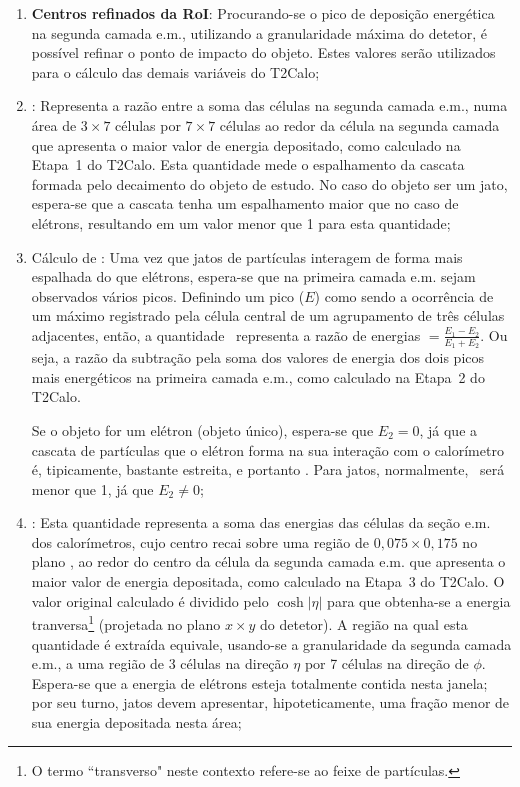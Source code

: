 \begin{enumerate}
\item \textbf{Centros refinados da RoI}: Procurando-se o pico de deposição
energética na segunda camada e.m., utilizando a granularidade máxima do
detetor, é possível refinar o ponto de impacto do objeto. Estes valores serão
utilizados para o cálculo das demais variáveis do T2Calo;

\item \textbf{\rcore}: Representa a razão entre a soma das células na segunda
camada e.m., numa área de $3 \times 7$ células por $7 \times 7$ células ao
redor da célula na segunda camada que apresenta o maior valor de energia
depositado, como calculado na Etapa~1 do T2Calo. Esta quantidade mede o
espalhamento da cascata formada pelo decaimento do objeto de estudo. No caso
do objeto ser um jato, espera-se que a cascata tenha um espalhamento maior que
no caso de elétrons, resultando em um valor menor que 1 para esta quantidade;

\item Cálculo de \textbf{\eratio}: Uma vez que jatos de par\-tí\-culas
interagem de forma mais espalhada do que e\-lé\-trons, espera-se que na
primeira camada e.m. sejam observados vários picos. Definindo um pico ($E$)
como sendo a ocorrência de um máximo registrado pela célula central de um
agrupamento de três células adjacentes, então, a quantidade \eratio\
representa a razão de energias \eratio$=\frac{E_1-E_2}{E_1+E_2}$. Ou seja, a
razão da subtração pela soma dos valores de energia dos dois picos mais
energéticos na primeira camada e.m., como calculado na Etapa~2 do T2Calo.

Se o objeto for um elétron (objeto único), espera-se que $E_2=0$, já que a
cascata de partículas que o elétron forma na sua interação com o calorímetro
é, tipicamente, bastante estreita, e portanto \eratio=1. Para jatos,
normalmente, \eratio\ será menor que 1, já que $E_2 \neq 0$;

\item \textbf{\etem}: Esta quantidade representa a soma das energias das
células da seção e.m. dos calorímetros, cujo centro recai sobre uma região de
$0,075 \times 0,175$ no plano \ep, ao redor do centro da célula da segunda
camada e.m. que apresenta o maior valor de energia depositada, como calculado
na Etapa~3 do T2Calo. O valor original calculado é dividido pelo
$\cosh{|\eta|}$ para que obtenha-se a energia tranversa\footnote{O termo
``transverso" neste contexto refere-se ao feixe de partículas.} (projetada no
plano $x \times y$ do detetor). A região na qual esta quantidade é extraída
equivale, usando-se a granularidade da segunda camada e.m., a uma região de 3
células na direção $\eta$ por 7 células na direção de $\phi$. Espera-se que a
energia de elétrons esteja totalmente contida nesta janela; por seu turno,
jatos devem apresentar, hipoteticamente, uma fração menor de sua energia
depositada nesta área;


\end{enumerate}
